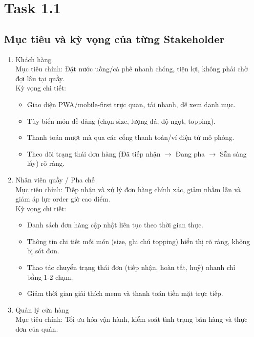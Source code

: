 \documentclass[english,12pt,a4paper]{book}
\begin{document}
	\pagestyle{empty}
\section{Task 1.1}
\subsection{Mục tiêu và kỳ vọng của từng Stakeholder}
\begin{enumerate}
	\item Khách hàng \\
	
	Mục tiêu chính: Đặt nước uống/cà phê nhanh chóng, tiện lợi, không phải chờ đợi lâu tại quầy.\\
	
	Kỳ vọng chi tiết:
	\begin{itemize}
		\item Giao diện PWA/mobile-first trực quan, tải nhanh, dễ xem danh mục.   
		\item Tùy biến món dễ dàng (chọn size, lượng đá, độ ngọt, topping).   
		\item Thanh toán mượt mà qua các cổng thanh toán/ví điện tử mô phỏng.
		\item Theo dõi trạng thái đơn hàng (Đã tiếp nhận $\rightarrow$ Đang pha $\rightarrow$ Sẵn sàng lấy) rõ ràng.   
	\end{itemize}
	\item Nhân viên quầy / Pha chế\\
	
		Mục tiêu chính: Tiếp nhận và xử lý đơn hàng chính xác, giảm nhầm lẫn và giảm áp lực order giờ cao điểm.   \\
	
	Kỳ vọng chi tiết:
	\begin{itemize}
		\item Danh sách đơn hàng cập nhật liên tục theo thời gian thực. 
		\item Thông tin chi tiết mỗi món (size, ghi chú topping) hiển thị rõ ràng, không bị sót đơn.     
		\item Thao tác chuyển trạng thái đơn (tiếp nhận, hoàn tất, huỷ) nhanh chỉ bằng 1-2 chạm.
		\item Giảm thời gian giải thích menu và thanh toán tiền mặt trực tiếp.   
	\end{itemize}
	\item Quản lý cửa hàng\\
	
	Mục tiêu chính: Tối ưu hóa vận hành, kiểm soát tình trạng bán hàng và thực đơn của quán.      \\
	

\end{enumerate}
\end{document}
